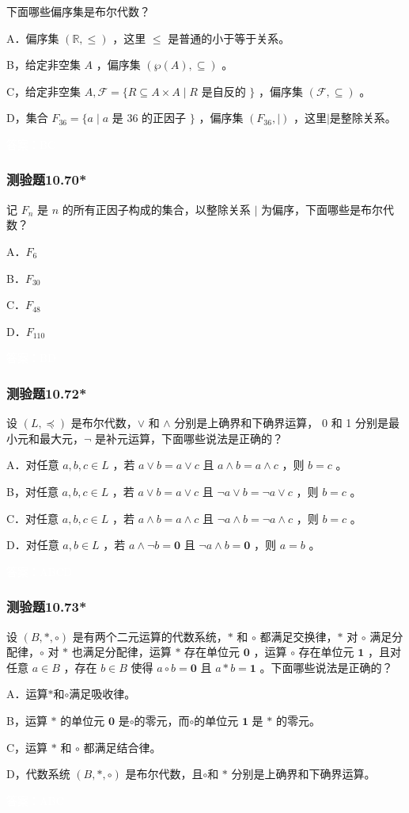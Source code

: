 \documentclass[UTF8, heading=true]{ctexart}
\begin{document}
下面哪些偏序集是布尔代数？

A．偏序集 $(\mathbb{R}, \leq)$ ，这里 $\leq$ 是普通的小于等于关系。

B，给定非空集 $A$ ，偏序集 $(\wp(A), \subseteq)$ 。

C，给定非空集 $A, \mathcal{F}=\{R \subseteq A \times A \mid R$ 是自反的 $\}$ ，偏序集 $(\mathcal{F}, \subseteq)$ 。

D，集合 $F_{36}=\{a \mid a$ 是 36 的正因子 $\}$ ，偏序集 $\left(F_{36}, \mid\right)$ ，这里$\mid$是整除关系。

\textcolor{white}{答案：BC}

\subsubsection{测验题10.70*}

记 $F_n$ 是 $n$ 的所有正因子构成的集合，以整除关系 $\mid$ 为偏序，下面哪些是布尔代数？

A．$ F_6$

B．$ F_{30}$

C．$F_{48}$

D．$ F_{110}$

\textcolor{white}{答案：BD}

\subsubsection{测验题10.72*}

设 $(L, \preceq)$ 是布尔代数，$\vee$ 和 $\wedge$ 分别是上确界和下确界运算， 0 和 1 分别是最小元和最大元，$\neg$ 是补元运算，下面哪些说法是正确的？

A．对任意 $a, b, c \in L$ ，若 $a \vee b=a \vee c$ 且 $a \wedge b=a \wedge c$ ，则 $b=c$ 。

B，对任意 $a, b, c \in L$ ，若 $a \vee b=a \vee c$ 且 $\neg a \vee b=\neg a \vee c$ ，则 $b=c$ 。

C．对任意 $a, b, c \in L$ ，若 $a \wedge b=a \wedge c$ 且 $\neg a \wedge b=\neg a \wedge c$ ，则 $b=c$ 。

D．对任意 $a, b \in L$ ，若 $a \wedge \neg b=\mathbf{0}$ 且 $\neg a \wedge b=\mathbf{0}$ ，则 $a=b$ 。


\textcolor{white}{答案：ABCD}

\subsubsection{测验题10.73*}

设 $(B, *, \circ)$ 是有两个二元运算的代数系统，$*$ 和 $\circ$ 都满足交换律，$*$ 对 $\circ$ 满足分配律，$\circ$ 对 $*$ 也满足分配律，运算 $*$ 存在单位元 $\mathbf{0}$ ，运算 $\circ$ 存在单位元 $\mathbf{1}$ ，且对任意 $a \in B$ ，存在 $b \in B$ 使得 $a \circ b=\mathbf{0}$ 且 $a * b=\mathbf{1}$ 。下面哪些说法是正确的？

A．运算$*$和$\circ$满足吸收律。

B，运算 $*$ 的单位元 $\mathbf{0}$ 是$\circ$的零元，而$\circ$的单位元 $\mathbf{1}$ 是 $*$ 的零元。

C，运算 $*$ 和 $\circ$ 都满足结合律。

D，代数系统 $(B, *, \circ)$ 是布尔代数，且$\circ$和 $*$ 分别是上确界和下确界运算。

\textcolor{white}{答案：ABC}
\end{document}
